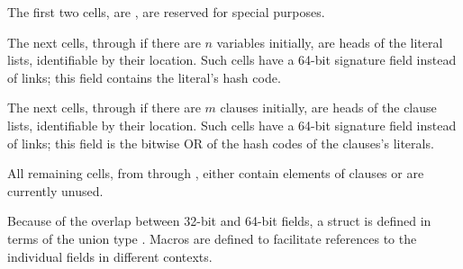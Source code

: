 The first two cells,  are , are reserved
for special
purposes.

The next cells,  through  if
there are $n$ variables
initially, are heads of the literal lists, identifiable by their location.
Such cells have a 64-bit signature field instead of 
links;
this field contains the literal's hash code.

The next cells,  through  if there are $m$ clauses
initially, are heads of the clause lists, identifiable by their location.
Such cells have a 64-bit signature field instead of 
links;
this field is the bitwise {\mc OR} of the hash codes of the clauses's
literals.

All remaining cells, from  through ,
either contain elements of clauses or are currently unused.

Because of the overlap between 32-bit and 64-bit fields, a 
struct is defined in terms of the union type . Macros are
defined to facilitate references to the individual fields in
different contexts.

